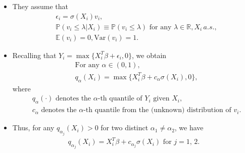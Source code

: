 \documentclass[xcolor=svgnames,dvipdfmx,cjk]{beamer}
\theoremstyle{example}
\def\Var{\text{Var}}
\def\E{\mathbb{E}}
\def\R{\mathbb{R}}
\def\P{\mathbb{P}}
\begin{document}
\begin{frame}
      \begin{itemize}
            \item They assume that 
                  \begin{align*}
                        &\epsilon_i = \sigma(X_i)v_i, \\
                        &\P(v_i \leq \lambda|X_i) \equiv \P(v_i \leq \lambda) \text{ for any } \lambda \in \R , X_i \, a.s.,\\
                        &\E(v_i)=0, \Var(v_i)=1. 
                  \end{align*}
            \item Recalling that $Y_i = \max\{X_i^T\beta + \epsilon_i, 0\}$, we obtain
                  \begin{align*}
                        &\text{For any } \alpha \in (0,1),\\
                        &q_{\alpha}(X_i) = \max\{X_i^T\beta + c_{\alpha}\sigma(X_i), 0\},
                  \end{align*}
                  where
                  \begin{align*}
                        & q_{\alpha}(\cdot) \text{ denotes the } \alpha \text{-th quantile of } Y_i \text{ given } X_i, \\
                        & c_{\alpha} \text{ denotes the } \alpha \text{-th quantile from the (unknown) distribution of } v_i.
                  \end{align*}
            \item Thus, for any $q_{\alpha_j}(X_i) > 0$ for two distinct $\alpha_1 \neq \alpha_2$, we have
                  \begin{align*}
                        q_{\alpha_j}(X_i) = X_i^T \beta + c_{\alpha_j} \sigma(X_i) \text{ for } j=1,\,2.
                  \end{align*}
      \end{itemize}
\end{frame}
\end{document}
